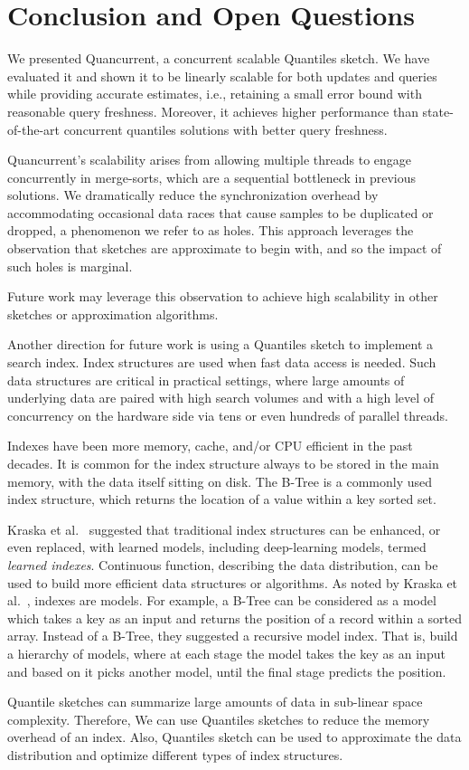 \chapter{Conclusion and Open Questions}
\label{chap:conclusion}



We presented Quancurrent, a concurrent scalable Quantiles sketch. We have evaluated it and shown it to be linearly scalable for both updates and queries while providing accurate estimates, i.e., retaining a small error bound with reasonable query freshness. Moreover, it achieves higher performance than state-of-the-art concurrent quantiles solutions with better query freshness.

Quancurrent's scalability arises from allowing multiple threads to engage concurrently in merge-sorts, which are a sequential bottleneck in previous solutions. We dramatically reduce the synchronization overhead by accommodating occasional data races that cause samples to be duplicated or dropped, a phenomenon we refer to as holes. This approach leverages the observation that sketches are approximate to begin with, and so the impact of such holes is marginal.

Future work may leverage this observation to achieve high scalability in other sketches or approximation algorithms.

Another direction for future work is using a Quantiles sketch to implement a search index. Index structures are used when fast data access is needed. Such data structures are critical in practical settings, where large amounts of underlying data are paired with high search volumes and with a high level of concurrency on the hardware side via tens or even hundreds of parallel threads. 

Indexes have been more memory, cache, and/or CPU efficient in the past decades. It is common for the index structure always to be stored in the main memory, with the data itself sitting on disk. The B-Tree is a commonly used index structure, which returns the location of a value within a key sorted set. 

Kraska et al.~\cite{case_learned_index} suggested that traditional index structures can be enhanced, or even replaced, with learned models, including deep-learning models, termed \emph{learned indexes}. Continuous function, describing the data distribution, can be used to build more efficient data structures or algorithms. As noted by Kraska et al.~\cite{case_learned_index}, indexes are models. For example, a B-Tree can be considered as a model which takes a key as an input and returns the position of a record within a sorted array. Instead of a B-Tree, they suggested a recursive model index. That is, build a hierarchy of models, where at each stage the model takes the key as an input and based on it picks another model, until the final stage predicts the position.

Quantile sketches can summarize large amounts of data in sub-linear space complexity. Therefore, We can use Quantiles sketches to reduce the memory overhead of an index. Also, Quantiles sketch can be used to approximate the data distribution and optimize different types of index structures.

